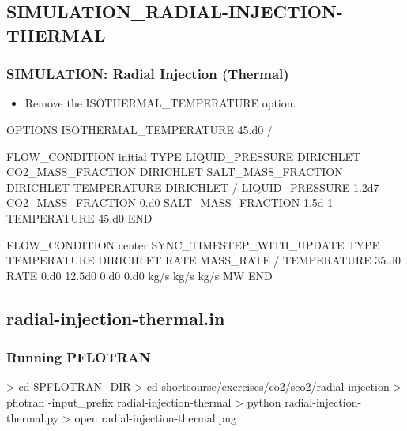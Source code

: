 \documentclass{beamer}
\newcommand\redcomment[1]{{{\color{red} #1}}}
\newcommand\greencomment[1]{{{\color{green} #1}}}
\begin{document}
\subsection{SIMULATION\_RADIAL-INJECTION-THERMAL}

\begin{frame}\frametitle{SIMULATION: Radial Injection (Thermal)}

\begin{semiverbatim}

\begin{itemize}
\item Remove the ISOTHERMAL\_TEMPERATURE option.
\end{itemize}

  \redcomment{OPTIONS}
    \redcomment{ISOTHERMAL_TEMPERATURE 45.d0}
  \redcomment{/}

\newpage
FLOW_CONDITION initial
  TYPE
    LIQUID_PRESSURE DIRICHLET
    CO2_MASS_FRACTION DIRICHLET
    SALT_MASS_FRACTION DIRICHLET
    \greencomment{TEMPERATURE DIRICHLET}
  /
  LIQUID_PRESSURE 1.2d7
  CO2_MASS_FRACTION 0.d0
  SALT_MASS_FRACTION 1.5d-1
  \greencomment{TEMPERATURE 45.d0}
END

\newpage
FLOW_CONDITION center
  SYNC_TIMESTEP_WITH_UPDATE
  TYPE
    TEMPERATURE DIRICHLET
    RATE MASS_RATE
  /
  \greencomment{TEMPERATURE 35.d0}
  RATE 0.d0 12.5d0 0.d0 \greencomment{0.d0} kg/s kg/s kg/s \greencomment{MW}
END
\end{semiverbatim}

\end{frame}
\subsection{radial-injection-thermal.in}

\begin{frame}[fragile]\frametitle{Running PFLOTRAN}

\begin{semiverbatim}

> cd \$PFLOTRAN_DIR
> cd shortcourse/exercises/co2/sco2/radial-injection
> pflotran -input_prefix radial-injection-thermal
> python radial-injection-thermal.py
> open radial-injection-thermal.png
\end{semiverbatim}

\end{frame}
\end{document}
